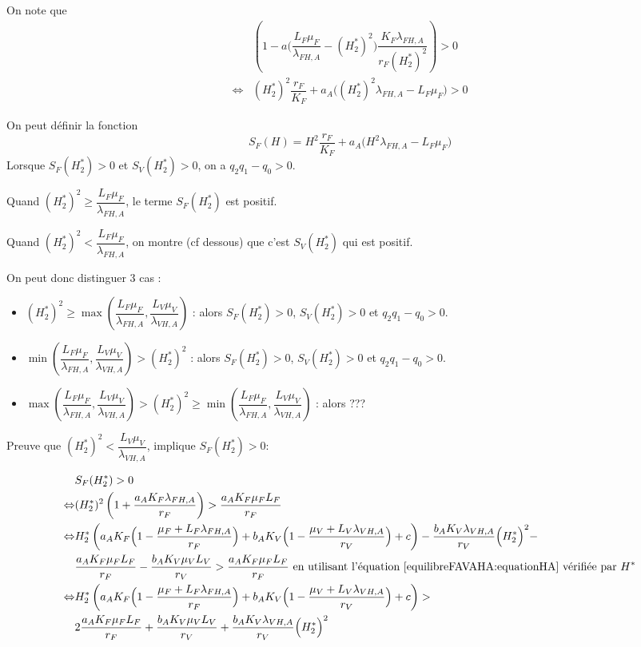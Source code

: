 \documentclass{article}
\newcommand{\lfa}{\lambda_{FH, A}}
\newcommand{\lva}{\lambda_{VH, A}}
\begin{document}
On note que 
\begin{align*}
&\left(1 - a \Big(\dfrac{L_F\mu_F}{\lfa}-(H^*_2)^2\Big) \dfrac{K_F\lfa}{r_F(H^*_2)^2}\right) > 0 \\
\Leftrightarrow &(H^*_2)^2 \dfrac{r_F}{K_F} + a_A \Big( (H^*_2)^2\lfa - L_F \mu_F\Big) > 0
\end{align*}
 

On peut définir la fonction 
\begin{equation}
S_F(H) = H^2 \dfrac{r_F}{K_F} + a_A \Big(H^2 \lfa  - L_F \mu_F\Big)
\end{equation}
Lorsque $S_F(H^*_2) > 0$ et $S_V(H^*_2) > 0$, on a $q_2q_1 - q_0 > 0$.

Quand $(H_2^*)^2 \geq \dfrac{L_F \mu_F}{\lfa}$, le terme $S_F(H^*_2)$ est positif.

Quand $(H_2^*)^2 < \dfrac{L_F \mu_F}{\lfa}$, on montre (cf dessous) que c'est $S_V(H^*_2)$ qui est positif.

On peut donc distinguer 3 cas : 
\begin{itemize}
\item $(H_2^*)^2 \geq \max \left( \dfrac{L_F \mu_F}{\lfa}, \dfrac{L_V \mu_V}{\lva} \right)$ : alors $S_F(H^*_2) > 0$, $S_V(H^*_2) > 0$ et $q_2q_1 - q_0 > 0$.
\item $\min\left( \dfrac{L_F \mu_F}{\lfa}, \dfrac{L_V \mu_V}{\lva} \right) > (H_2^*)^2$ : alors $S_F(H^*_2) > 0$, $S_V(H^*_2) > 0$ et $q_2q_1 - q_0 > 0$.
\item $\max \left( \dfrac{L_F \mu_F}{\lfa}, \dfrac{L_V \mu_V}{\lva} \right) > (H_2^*)^2 \geq \min\left( \dfrac{L_F \mu_F}{\lfa}, \dfrac{L_V \mu_V}{\lva} \right)$ : alors ???
\end{itemize}

Preuve que $(H_2^*)^2 < \dfrac{L_V \mu_V}{\lva}$, implique $S_F(H^*_2) > 0$:


\begin{align*}
& S_F(H^*_2) > 0 \\
\Leftrightarrow & (H_2^*)^2 \left(1 + \dfrac{a_A K_F \lfa}{r_F} \right) > \dfrac{a_A K_F \mu_F L_F}{r_F} \\
\Leftrightarrow & H^*_2 \left( a_A K_F \Big(1-\dfrac{\mu_F +L_F \lfa}{r_F}\Big) + b_A K_V \Big(1-\dfrac{\mu_V +L_V \lva}{r_V}\Big) + c \right) - \dfrac{b_A K_V \lva}{r_V  }\Big(H^*_2\Big)^2 - \\ & \dfrac{a_A K_F \mu_F L_F}{r_F} - \dfrac{b_A K_V \mu_V L_V}{r_V} > \dfrac{a_A K_F \mu_F L_F}{r_F} \text{ en utilisant l'équation \eqref{equilibreFAVAHA:equationHA} vérifiée par $H^*$} \\
\Leftrightarrow & H^*_2 \left( a_A K_F \Big(1-\dfrac{\mu_F +L_F \lfa}{r_F}\Big) + b_A K_V \Big(1-\dfrac{\mu_V +L_V \lva}{r_V}\Big) + c \right) > \\ & 2 \dfrac{a_A K_F \mu_F L_F}{r_F} + \dfrac{b_A K_V \mu_V L_V}{r_V} + \dfrac{b_A K_V \lva}{r_V  }\Big(H^*_2\Big)^2
\end{align*}
\end{document}
